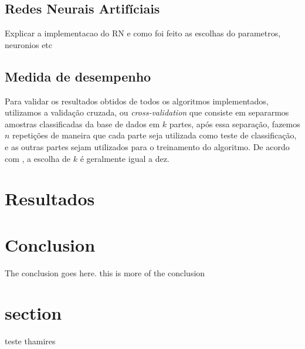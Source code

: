 \documentclass[10pt, conference, compsocconf]{IEEEtran}
\begin{document}
\subsection{Redes Neurais Artifíciais}
Explicar a implementacao do RN e como foi feito as escolhas do parametros, neuronios etc
\subsection{Medida de desempenho}
Para validar os resultados obtidos de todos os algoritmos implementados, utilizamos a validação cruzada, ou \textit{cross-validation} que consiste em separarmos amostras classificadas da base de dados em $k$ partes, após essa separação, fazemos $n$ repetições de maneira que cada parte seja utilizada como teste de classificação, e as outras partes sejam utilizados para o treinamento do algoritmo. De acordo com \cite{10}, a escolha de $k$ é geralmente igual a dez.

\section{Resultados}\label{resultados}




\section{Conclusion}
The conclusion goes here. this is more of the conclusion


\section{section}
teste thamires

%


\end{document}
